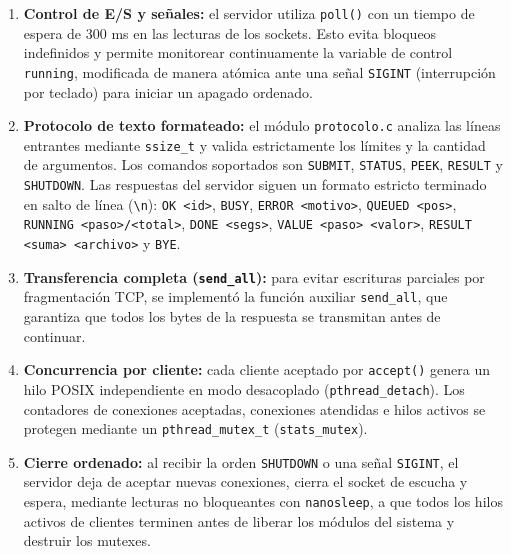 \documentclass[12pt,a4paper]{article}
\begin{document}
\begin{enumerate}
\item \textbf{Control de E/S y señales:} el servidor utiliza \texttt{poll()} con un tiempo de espera de 300 ms en las lecturas de los sockets. Esto evita bloqueos indefinidos y permite monitorear continuamente la variable de control \texttt{running}, modificada de manera atómica ante una señal \texttt{SIGINT} (interrupción por teclado) para iniciar un apagado ordenado.
\item \textbf{Protocolo de texto formateado:} el módulo \texttt{protocolo.c} analiza las líneas entrantes mediante \texttt{ssize\_t} y valida estrictamente los límites y la cantidad de argumentos. Los comandos soportados son \texttt{SUBMIT}, \texttt{STATUS}, \texttt{PEEK}, \texttt{RESULT} y \texttt{SHUTDOWN}. Las respuestas del servidor siguen un formato estricto terminado en salto de línea (\texttt{\textbackslash n}): \texttt{OK <id>}, \texttt{BUSY}, \texttt{ERROR <motivo>}, \texttt{QUEUED <pos>}, \texttt{RUNNING <paso>/<total>}, \texttt{DONE <segs>}, \texttt{VALUE <paso> <valor>}, \texttt{RESULT <suma> <archivo>} y \texttt{BYE}.
\item \textbf{Transferencia completa (\texttt{send\_all}):} para evitar escrituras parciales por fragmentación TCP, se implementó la función auxiliar \texttt{send\_all}, que garantiza que todos los bytes de la respuesta se transmitan antes de continuar.
\item \textbf{Concurrencia por cliente:} cada cliente aceptado por \texttt{accept()} genera un hilo POSIX independiente en modo desacoplado (\texttt{pthread\_detach}). Los contadores de conexiones aceptadas, conexiones atendidas e hilos activos se protegen mediante un \texttt{pthread\_mutex\_t} (\texttt{stats\_mutex}).
\item \textbf{Cierre ordenado:} al recibir la orden \texttt{SHUTDOWN} o una señal \texttt{SIGINT}, el servidor deja de aceptar nuevas conexiones, cierra el socket de escucha y espera, mediante lecturas no bloqueantes con \texttt{nanosleep}, a que todos los hilos activos de clientes terminen antes de liberar los módulos del sistema y destruir los mutexes.
\end{enumerate}
\end{document}
